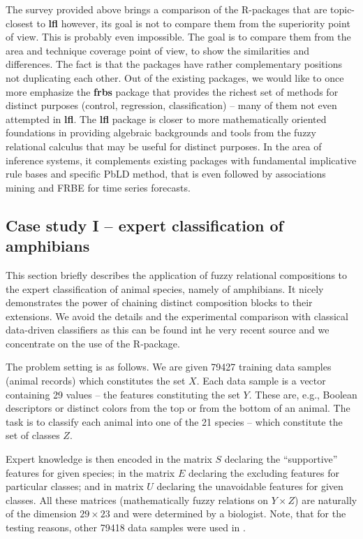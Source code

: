 \documentclass[review]{elsarticle}
\newcommand{\pkg}[1]{\textbf{#1}}
\begin{document}
The survey provided above brings a comparison of the R-packages that are topic-closest to \pkg{lfl} however, its goal is not to compare them from the superiority point of view. This is probably even impossible. The goal is to compare them from the area and technique coverage point of view, to show the similarities and differences. The fact is that the packages have rather complementary positions not duplicating each other. Out of the existing packages, we would like to once more emphasize the \pkg{frbs} package that provides the richest set of methods for distinct purposes (control, regression, classification) -- many of them not even attempted in \pkg{lfl}. The \pkg{lfl} package is closer to more mathematically oriented foundations in providing algebraic backgrounds and tools from the fuzzy relational calculus that may be useful for distinct purposes. In the area of  inference systems, it complements existing packages with fundamental implicative rule bases and specific PbLD method, that is even followed by associations mining and FRBE for time series forecasts. 




\subsection{Case study I -- expert classification of amphibians}

This section briefly describes the application of fuzzy relational compositions to the expert classification of animal species, namely of amphibians. It nicely demonstrates the power of chaining distinct composition blocks to their extensions. We avoid the details and the experimental comparison with classical data-driven classifiers as this can be found int he very recent source \cite{Step_etal:Unavoidable_KNOSYS2020} and we concentrate on the use of the R-package. 

The problem setting is as follows. We are given 79427 training data samples (animal records) which constitutes the set $X$. Each data sample is a vector containing 29 values -- the features constituting the set $Y$. These are, e.g., Boolean descriptors or  distinct colors from the top or from the bottom of an animal. The task is to classify each animal into one of the 21 species -- which constitute the set of classes $Z$.

Expert knowledge is then encoded in the matrix $S$ declaring the ``supportive'' features for given species; in the matrix $E$ declaring the excluding features for particular classes; and in matrix $U$ declaring the unavoidable features for given classes. All these matrices (mathematically fuzzy relations on $Y\times Z$) are naturally of the dimension $29\times 23$ and were determined by a biologist. Note, that for the testing reasons, other 79418 data samples were used in \cite{Step_etal:Unavoidable_KNOSYS2020}.
\end{document}
